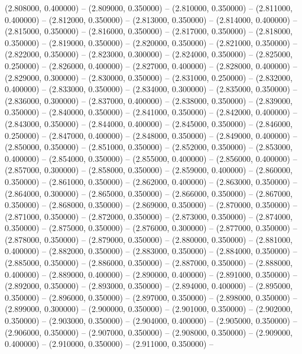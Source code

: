(2.808000, 0.400000) -- 
(2.809000, 0.350000) -- 
(2.810000, 0.350000) -- 
(2.811000, 0.400000) -- 
(2.812000, 0.350000) -- 
(2.813000, 0.350000) -- 
(2.814000, 0.400000) -- 
(2.815000, 0.350000) -- 
(2.816000, 0.350000) -- 
(2.817000, 0.350000) -- 
(2.818000, 0.350000) -- 
(2.819000, 0.350000) -- 
(2.820000, 0.350000) -- 
(2.821000, 0.350000) -- 
(2.822000, 0.350000) -- 
(2.823000, 0.300000) -- 
(2.824000, 0.350000) -- 
(2.825000, 0.250000) -- 
(2.826000, 0.400000) -- 
(2.827000, 0.400000) -- 
(2.828000, 0.400000) -- 
(2.829000, 0.300000) -- 
(2.830000, 0.350000) -- 
(2.831000, 0.250000) -- 
(2.832000, 0.400000) -- 
(2.833000, 0.350000) -- 
(2.834000, 0.300000) -- 
(2.835000, 0.350000) -- 
(2.836000, 0.300000) -- 
(2.837000, 0.400000) -- 
(2.838000, 0.350000) -- 
(2.839000, 0.350000) -- 
(2.840000, 0.350000) -- 
(2.841000, 0.350000) -- 
(2.842000, 0.400000) -- 
(2.843000, 0.350000) -- 
(2.844000, 0.400000) -- 
(2.845000, 0.350000) -- 
(2.846000, 0.250000) -- 
(2.847000, 0.400000) -- 
(2.848000, 0.350000) -- 
(2.849000, 0.400000) -- 
(2.850000, 0.350000) -- 
(2.851000, 0.350000) -- 
(2.852000, 0.350000) -- 
(2.853000, 0.400000) -- 
(2.854000, 0.350000) -- 
(2.855000, 0.400000) -- 
(2.856000, 0.400000) -- 
(2.857000, 0.300000) -- 
(2.858000, 0.350000) -- 
(2.859000, 0.400000) -- 
(2.860000, 0.350000) -- 
(2.861000, 0.350000) -- 
(2.862000, 0.400000) -- 
(2.863000, 0.350000) -- 
(2.864000, 0.300000) -- 
(2.865000, 0.350000) -- 
(2.866000, 0.350000) -- 
(2.867000, 0.350000) -- 
(2.868000, 0.350000) -- 
(2.869000, 0.350000) -- 
(2.870000, 0.350000) -- 
(2.871000, 0.350000) -- 
(2.872000, 0.350000) -- 
(2.873000, 0.350000) -- 
(2.874000, 0.350000) -- 
(2.875000, 0.350000) -- 
(2.876000, 0.300000) -- 
(2.877000, 0.350000) -- 
(2.878000, 0.350000) -- 
(2.879000, 0.350000) -- 
(2.880000, 0.350000) -- 
(2.881000, 0.400000) -- 
(2.882000, 0.350000) -- 
(2.883000, 0.350000) -- 
(2.884000, 0.350000) -- 
(2.885000, 0.350000) -- 
(2.886000, 0.350000) -- 
(2.887000, 0.350000) -- 
(2.888000, 0.400000) -- 
(2.889000, 0.400000) -- 
(2.890000, 0.400000) -- 
(2.891000, 0.350000) -- 
(2.892000, 0.350000) -- 
(2.893000, 0.350000) -- 
(2.894000, 0.400000) -- 
(2.895000, 0.350000) -- 
(2.896000, 0.350000) -- 
(2.897000, 0.350000) -- 
(2.898000, 0.350000) -- 
(2.899000, 0.300000) -- 
(2.900000, 0.350000) -- 
(2.901000, 0.350000) -- 
(2.902000, 0.350000) -- 
(2.903000, 0.350000) -- 
(2.904000, 0.400000) -- 
(2.905000, 0.350000) -- 
(2.906000, 0.350000) -- 
(2.907000, 0.350000) -- 
(2.908000, 0.350000) -- 
(2.909000, 0.400000) -- 
(2.910000, 0.350000) -- 
(2.911000, 0.350000) -- 
